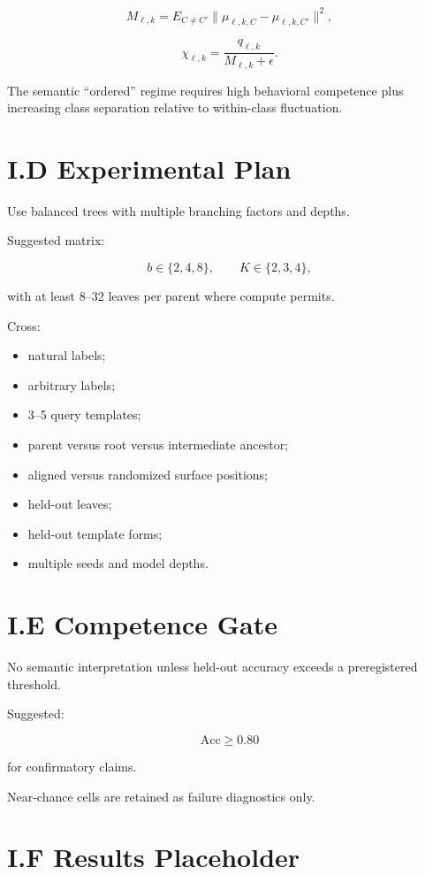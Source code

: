 \documentclass[10pt]{article}
\begin{document}
\[
M_{\ell,k}
=
E_{C\neq C'}
\|\mu_{\ell,k,C}-\mu_{\ell,k,C'}\|^2,
\]

\[
\chi_{\ell,k}
=
\frac{q_{\ell,k}}
{M_{\ell,k}+\epsilon}.
\]

The semantic ``ordered'' regime requires high behavioral competence plus increasing class separation relative to within-class fluctuation.

\section{I.D Experimental Plan}

Use balanced trees with multiple branching factors and depths.

Suggested matrix:

\[
b\in\{2,4,8\},
\qquad
K\in\{2,3,4\},
\]

with at least 8--32 leaves per parent where compute permits.

Cross:

\begin{itemize}
\item natural labels;
\item arbitrary labels;
\item 3--5 query templates;
\item parent versus root versus intermediate ancestor;
\item aligned versus randomized surface positions;
\item held-out leaves;
\item held-out template forms;
\item multiple seeds and model depths.
\end{itemize}

\section{I.E Competence Gate}

No semantic interpretation unless held-out accuracy exceeds a preregistered threshold.

Suggested:

\[
\mathrm{Acc}\ge 0.80
\]

for confirmatory claims.

Near-chance cells are retained as failure diagnostics only.

\section{I.F Results Placeholder}
\end{document}
